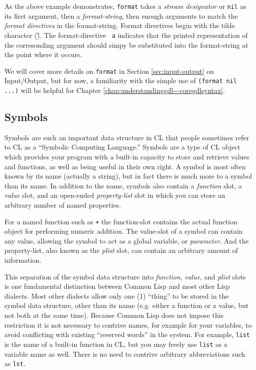 \documentclass [11pt]{book}
\begin{document}
As the above example demonstrates, \texttt{format} takes a \emph{stream designator} or \texttt{nil} as its first argument, then a \emph{format-string}, then enough arguments to match the \emph{format directives} in the format-string. Format directives begin with the
tilde character (\~).  The format-directive \texttt{~a} indicates that the printed representation of the corresonding argument should simpy be 
substituted into the format-string at the point where it occurs.



We will cover more details on \texttt{format} in Section 
\ref{sec:input-output} on Input/Output, but for now, a familiarity with the simple use of \texttt{(format nil ...)} will be helpful for Chapter 
\ref{chap:understandinggdl---coregdlsyntax}.



\subsection{Symbols}

\label{subsec:symbols}



Symbols are such an important data structure in CL that people
sometimes refer to CL as a ``Symbolic Computing Language.'' Symbols
are a type of CL object which provides your program with a built-in
capacity to store and retrieve values and functions, as well as being
useful in their own right. A symbol is most often known by its name
 (actually a string), but in fact there is much more to a symbol than
its name. In addition to the name, symbols also contain a \emph{function} slot, a \emph{value} slot, and an open-ended \emph{property-list} slot in which you can store an arbitrary number of named properties.



For a named function such as \texttt{+} the function-slot contains the actual function
object for performing numeric addition. The value-slot of a symbol can
contain any value, allowing the symbol to act as a global variable, or \emph{parameter}. And the property-list, also known as the \emph{plist} slot, can contain an arbitrary amount of information.



This separation of the symbol data structure into \emph{function}, \emph{value}, and \emph{plist} slots is one fundamental distinction between Common Lisp
and most other Lisp dialects. Most other dialects allow only one (1)
``thing'' to be stored in the symbol data structure, other than its
name (e.g. either a function or a value, but not both at the same
time). Because Common Lisp does not impose this restriction it is not
necessary to contrive names, for example for your variables, to avoid
conflicting with existing ``reserved words'' in the system. For
example, \texttt{list} is the name of a built-in function in CL, but you may
freely use \texttt{list} as a variable name as well. There is no need to
contrive arbitrary abbreviations such as \texttt{lst}.
\end{document}
